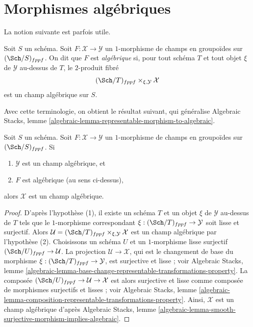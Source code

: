 \section{Morphismes algébriques}
\label{section-algebraic}

\noindent
La notion suivante est parfois utile.

\begin{definition}
\label{definition-algebraic}
Soit $S$ un schéma. Soit $F : \mathcal{X} \to \mathcal{Y}$ un
$1$-morphisme de champs en groupoïdes sur $(\Sch/S)_{fppf}$.
On dit que $F$ est {\it algébrique} si, pour tout schéma $T$ et tout
objet $\xi$ de $\mathcal{Y}$ au-dessus de $T$, le $2$-produit fibré
$$
(\Sch/T)_{fppf} \times_{\xi, \mathcal{Y}} \mathcal{X}
$$
est un champ algébrique sur $S$.
\end{definition}

\noindent
Avec cette terminologie, on obtient le résultat suivant, qui généralise
Algebraic Stacks, lemme
\ref{algebraic-lemma-representable-morphism-to-algebraic}.

\begin{lemma}
\label{lemma-algebraic-morphism-to-algebraic}
Soit $S$ un schéma.
Soit $F : \mathcal{X} \to \mathcal{Y}$ un $1$-morphisme de
champs en groupoïdes sur $(\Sch/S)_{fppf}$. Si
\begin{enumerate}
\item $\mathcal{Y}$ est un champ algébrique, et
\item $F$ est algébrique (au sens ci-dessus),
\end{enumerate}
alors $\mathcal{X}$ est un champ algébrique.
\end{lemma}

\begin{proof}
D'après l'hypothèse (1), il existe un schéma $T$ et un objet
$\xi$ de $\mathcal{Y}$ au-dessus de $T$ tels que le
$1$-morphisme correspondant $\xi : (\Sch/T)_{fppf} \to \mathcal{Y}$
soit lisse et surjectif. Alors
$\mathcal{U} = (\Sch/T)_{fppf} \times_{\xi, \mathcal{Y}} \mathcal{X}$
est un champ algébrique par l'hypothèse (2).
Choisissons un schéma $U$ et un $1$-morphisme lisse surjectif
$(\Sch/U)_{fppf} \to \mathcal{U}$.
La projection $\mathcal{U} \longrightarrow \mathcal{X}$,
qui est le changement de base du morphisme
$\xi : (\Sch/T)_{fppf} \to \mathcal{Y}$,
est surjective et lisse ; voir
Algebraic Stacks, lemme
\ref{algebraic-lemma-base-change-representable-transformations-property}.
La composée
$(\Sch/U)_{fppf} \to \mathcal{U} \to \mathcal{X}$
est alors surjective et lisse comme composée de
morphismes surjectifs et lisses ; voir
Algebraic Stacks, lemme
\ref{algebraic-lemma-composition-representable-transformations-property}.
Ainsi, $\mathcal{X}$ est un champ algébrique d'après
Algebraic Stacks, lemme
\ref{algebraic-lemma-smooth-surjective-morphism-implies-algebraic}.
\end{proof}

